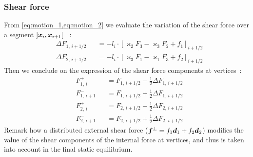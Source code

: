 \subsubsection{Shear force}
From \cref{eq:motion_1,eq:motion_2} we evaluate the variation of the shear force over a segment $]\boldsymbol{x}_{i},  \boldsymbol{x}_{i+1}[$ ~:
\begin{subequations}
	\begin{alignat}{2}
		&\Delta F_{1,\,i+1/2}^{} &&= - l_i  \cdot {[\varkappa_2 F_3 - \varkappa_3 F_2 + f_1]}_{i+1/2}
		\\
		&\Delta F_{2,\,i+1/2}^{} &&= - l_i  \cdot {[\varkappa_3 F_1 - \varkappa_1 F_3 + f_2]}_{i+1/2}
	\end{alignat}
	\label{eq:DeltaF}
\end{subequations}
Then we conclude on the expression of the shear force components at vertices~:
\begin{subequations}
	\label{eq:dFi}
	\begin{alignat}{2}
		&F_{1,\,i}^{+} &&= F_{1,\,i+1/2} - \frac{1}{2} \Delta F_{1,\,i+1/2}  \\[0.5em]
		&F_{1,\,i+1}^{-} &&= F_{1,\,i+1/2} + \frac{1}{2} \Delta F_{1,\,i+1/2} \\[0.5em]
		&F_{2,\,i}^{+} &&= F_{2,\,i+1/2} - \frac{1}{2} \Delta F_{2,\,i+1/2}  \\[0.5em]
		&F_{2,\,i+1}^{-} &&= F_{2,\,i+1/2} + \frac{1}{2} \Delta F_{2,\,i+1/2}
	\end{alignat}
\end{subequations}
Remark how a distributed external shear force ($\boldsymbol{f}^{\perp} = f_1\boldsymbol{d}_1 + f_2\boldsymbol{d}_2$) modifies the value of the shear components of the internal force at vertices, and thus is taken into account in the final static equilibrium.

